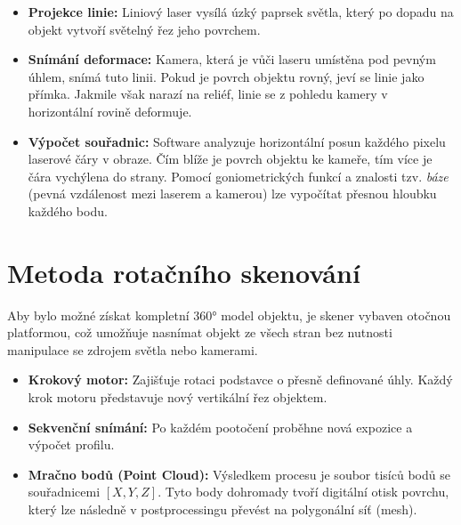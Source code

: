 \documentclass[12pt,a4paper]{report}
\begin{document}
\begin{itemize}
    \item \textbf{Projekce linie:} Liniový laser vysílá úzký paprsek světla, který po dopadu na objekt vytvoří světelný řez jeho povrchem. 
    \item \textbf{Snímání deformace:} Kamera, která je vůči laseru umístěna pod pevným úhlem, snímá tuto linii. Pokud je povrch objektu rovný, jeví se linie jako přímka. Jakmile však narazí na reliéf, linie se z pohledu kamery v horizontální rovině deformuje.
    \item \textbf{Výpočet souřadnic:} Software analyzuje horizontální posun každého pixelu \mbox{laserové} čáry v obraze. Čím blíže je povrch objektu ke kameře, tím více je čára vychýlena do strany. Pomocí goniometrických funkcí a znalosti tzv. \textit{báze} (pevná vzdálenost mezi laserem a kamerou) lze vypočítat přesnou hloubku každého bodu.
\end{itemize}



\section{Metoda rotačního skenování}
Aby bylo možné získat kompletní 360° model objektu, je skener vybaven otočnou \mbox{platformou}, což umožňuje nasnímat objekt ze všech stran bez nutnosti manipulace se zdrojem světla nebo kamerami.

\begin{itemize}
    \item \textbf{Krokový motor:} Zajišťuje rotaci podstavce o přesně definované úhly. Každý krok motoru představuje nový vertikální řez objektem.
    \item \textbf{Sekvenční snímání:} Po každém pootočení proběhne nová expozice a výpočet \mbox{profilu.} 
    \item \textbf{Mračno bodů (Point Cloud):} Výsledkem procesu je soubor tisíců bodů se souřadnicemi $[X, Y, Z]$. Tyto body dohromady tvoří digitální otisk povrchu, který lze následně v postprocessingu převést na polygonální síť (mesh).
\end{itemize}
\end{document}
